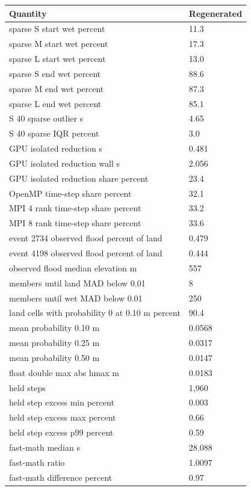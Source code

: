 \begin{tabular}{ll}
Quantity & Regenerated \\
\hline
sparse S start wet percent & 11.3 \\
sparse M start wet percent & 17.3 \\
sparse L start wet percent & 13.0 \\
sparse S end wet percent & 88.6 \\
sparse M end wet percent & 87.3 \\
sparse L end wet percent & 85.1 \\
S 40 sparse outlier s & 4.65 \\
S 40 sparse IQR percent & 3.0 \\
GPU isolated reduction s & 0.481 \\
GPU isolated reduction wall s & 2.056 \\
GPU isolated reduction share percent & 23.4 \\
OpenMP time-step share percent & 32.1 \\
MPI 4 rank time-step share percent & 33.2 \\
MPI 8 rank time-step share percent & 33.6 \\
event 2734 observed flood percent of land & 0.479 \\
event 4198 observed flood percent of land & 0.444 \\
observed flood median elevation m & 557 \\
members until land MAD below 0.01 & 8 \\
members until wet MAD below 0.01 & 250 \\
land cells with probability 0 at 0.10 m percent & 90.4 \\
mean probability 0.10 m & 0.0568 \\
mean probability 0.25 m & 0.0317 \\
mean probability 0.50 m & 0.0147 \\
float double max abs hmax m & 0.0183 \\
held steps & 1,960 \\
held step excess min percent & 0.003 \\
held step excess max percent & 0.66 \\
held step excess p99 percent & 0.59 \\
fast-math median s & 28.088 \\
fast-math ratio & 1.0097 \\
fast-math difference percent & 0.97 \\

\end{tabular}

